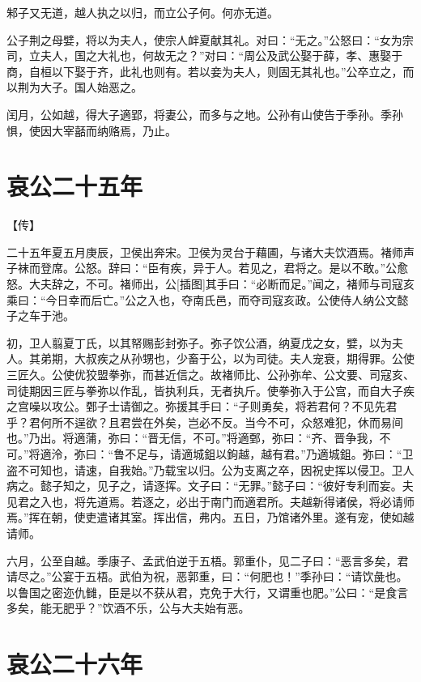 \documentclass[a4paper,12pt,UTF8,twoside]{ctexbook}
\begin{document}
邾子又无道，越人执之以归，而立公子何。何亦无道。

公子荆之母嬖，将以为夫人，使宗人衅夏献其礼。对曰：“无之。”公怒曰：“女为宗司，立夫人，国之大礼也，何故无之？”对曰：“周公及武公娶于薛，孝、惠娶于商，自桓以下娶于齐，此礼也则有。若以妾为夫人，则固无其礼也。”公卒立之，而以荆为大子。国人始恶之。

闰月，公如越，得大子適郢，将妻公，而多与之地。公孙有山使告于季孙。季孙惧，使因大宰嚭而纳赂焉，乃止。


\chapter{哀公二十五年}


【传】

二十五年夏五月庚辰，卫侯出奔宋。卫侯为灵台于藉圃，与诸大夫饮酒焉。褚师声子袜而登席。公怒。辞曰：“臣有疾，异于人。若见之，君将之。是以不敢。”公愈怒。大夫辞之，不可。褚师出，公[插图]其手曰：“必断而足。”闻之，褚师与司寇亥乘曰：“今日幸而后亡。”公之入也，夺南氏邑，而夺司寇亥政。公使侍人纳公文懿子之车于池。

初，卫人翦夏丁氏，以其帑赐彭封弥子。弥子饮公酒，纳夏戊之女，嬖，以为夫人。其弟期，大叔疾之从孙甥也，少畜于公，以为司徒。夫人宠衰，期得罪。公使三匠久。公使优狡盟拳弥，而甚近信之。故褚师比、公孙弥牟、公文要、司寇亥、司徒期因三匠与拳弥以作乱，皆执利兵，无者执斤。使拳弥入于公宫，而自大子疾之宫噪以攻公。鄄子士请御之。弥援其手曰：“子则勇矣，将若君何？不见先君乎？君何所不逞欲？且君尝在外矣，岂必不反。当今不可，众怒难犯，休而易间也。”乃出。将適蒲，弥曰：“晋无信，不可。”将適鄄，弥曰：“齐、晋争我，不可。”将適泠，弥曰：“鲁不足与，请適城鉏以鉤越，越有君。”乃適城鉏。弥曰：“卫盗不可知也，请速，自我始。”乃载宝以归。公为支离之卒，因祝史挥以侵卫。卫人病之。懿子知之，见子之，请逐挥。文子曰：“无罪。”懿子曰：“彼好专利而妄。夫见君之入也，将先道焉。若逐之，必出于南门而適君所。夫越新得诸侯，将必请师焉。”挥在朝，使吏遣诸其室。挥出信，弗内。五日，乃馆诸外里。遂有宠，使如越请师。

六月，公至自越。季康子、孟武伯逆于五梧。郭重仆，见二子曰：“恶言多矣，君请尽之。”公宴于五梧。武伯为祝，恶郭重，曰：“何肥也！”季孙曰：“请饮彘也。以鲁国之密迩仇雠，臣是以不获从君，克免于大行，又谓重也肥。”公曰：“是食言多矣，能无肥乎？”饮酒不乐，公与大夫始有恶。





\chapter{哀公二十六年}
\end{document}
